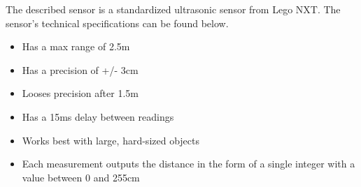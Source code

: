 
The described sensor is a standardized ultrasonic sensor from Lego NXT. The
sensor's technical specifications \citep{Ultrasonic_sensor} can be found below.
\begin{itemize}
  \item Has a max range of 2.5m
  \item Has a precision of +/- 3cm
  \item Looses precision after 1.5m
  \item Has a 15ms delay between readings
  \item Works best with large, hard-sized objects
  \item Each measurement outputs the distance in the form of a single integer
  with a value between 0 and 255cm
\end{itemize}

% 













